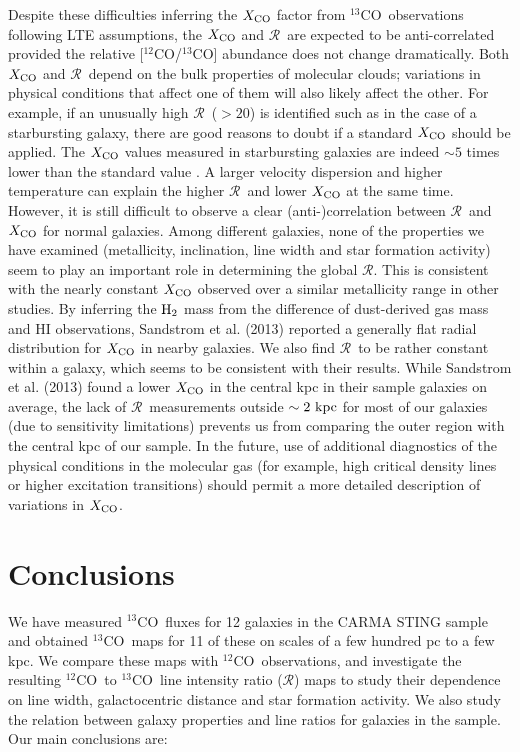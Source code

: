 \documentclass{emulateapj}
\def\ttco{\mbox{$^{13}$CO}}
\def\twco{\mbox{$^{12}$CO}}
\def\rtt{$\mathcal{R}$}
\begin{document}
Despite these difficulties inferring the $X_{\rm CO}$ factor from 
\ttco \ observations following LTE assumptions, the $X_{\rm CO}$ and \rtt \ are expected to be anti-correlated provided the
relative [\twco/\ttco] abundance does not change dramatically.
Both $X_{\rm CO}$ and \rtt \ depend on the bulk properties 
of molecular clouds; variations in physical conditions that affect one of them 
will also likely affect the other. 
For example, if an unusually high \rtt \ ($>20$) is identified such as 
in the case of a starbursting galaxy, 
there are good reasons to 
doubt if a standard $X_{\rm CO}$ should be applied. 
The $X_{\rm CO}$ values measured in starbursting galaxies are indeed $\sim 5$ times lower 
than the standard value \citep{Bryant1999, Papadopoulos2012}.
A larger velocity dispersion and higher temperature can explain the 
higher \rtt \ and lower $X_{\rm CO}$ at the same time. 
However, it is still difficult to observe a clear (anti-)correlation 
between \rtt \ and $X_{\rm CO}$  for normal galaxies. 
Among different galaxies, none of the properties 
we have examined (metallicity, inclination, line width and star formation activity)
seem to play an important role in determining the global \rtt. 
This is consistent with the nearly constant $X_{\rm CO}$ observed over 
a similar metallicity range in other studies. 
By inferring the $\rm H_{2}$ mass from the difference of dust-derived gas mass 
and HI observations, Sandstrom et al. (2013) reported a 
generally flat radial distribution for $X_{\rm CO}$ in nearby galaxies. 
We also find \rtt \ to be rather constant within a galaxy, 
which seems to be consistent with their results. 
While Sandstrom et al. (2013) found a lower $X_{\rm CO}$ in 
the central kpc in their sample galaxies on average,  
the lack of \rtt \ measurements outside $\sim 2 \rm \ kpc$ 
for most of our galaxies (due to sensitivity limitations)  
prevents us from comparing the outer region with the central kpc of our sample. 
In the future, use of additional diagnostics of the physical
conditions in the molecular gas (for example, high critical density
lines or higher excitation transitions) should permit a more detailed
description of variations in $X_{\rm CO}$.

\section{Conclusions}
We have measured \ttco \  fluxes for 12 galaxies in the CARMA STING sample and obtained \ttco \  maps for 11 of these on scales of a few hundred pc to a few kpc. 
We compare these maps with \twco \ observations, and investigate 
the resulting  \twco \ to \ttco \ line intensity ratio (\rtt) maps to study 
their dependence on line width, galactocentric distance and 
star formation activity. 
We also study the relation between galaxy properties and 
line ratios for galaxies in the sample.
Our main conclusions are: 
\end{document}
